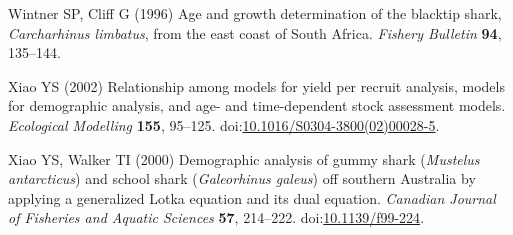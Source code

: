 \documentclass[]{article}
\begin{document}
\hypertarget{ref-wintner_age_1996}{}
Wintner SP, Cliff G (1996) Age and growth determination of the blacktip
shark, \emph{Carcharhinus limbatus}, from the east coast of South
Africa. \emph{Fishery Bulletin} \textbf{94}, 135--144.

\hypertarget{ref-xiao_relationship_2002}{}
Xiao YS (2002) Relationship among models for yield per recruit analysis,
models for demographic analysis, and age- and time-dependent stock
assessment models. \emph{Ecological Modelling} \textbf{155}, 95--125.
doi:\href{https://doi.org/10.1016/S0304-3800(02)00028-5}{10.1016/S0304-3800(02)00028-5}.

\hypertarget{ref-xiao_demographic_2000}{}
Xiao YS, Walker TI (2000) Demographic analysis of gummy shark
(\emph{Mustelus antarcticus}) and school shark (\emph{Galeorhinus
galeus}) off southern Australia by applying a generalized Lotka equation
and its dual equation. \emph{Canadian Journal of Fisheries and Aquatic
Sciences} \textbf{57}, 214--222.
doi:\href{https://doi.org/10.1139/f99-224}{10.1139/f99-224}.
\end{document}
